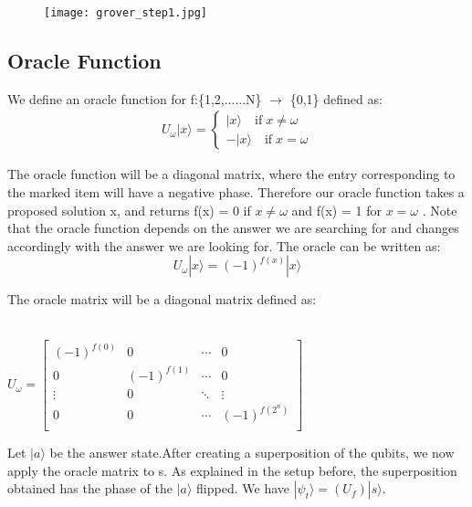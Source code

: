 \begin{figure}[!ht]
  \centering
  \texttt{[image: grover\_step1.jpg]}
\end{figure}


\subsection{Oracle Function}
We define an oracle function for f:\{1,2,......N\} $\rightarrow$ \{0,1\} defined as: \\
\begin{align*}
 U_\omega|x\rangle =
    \begin{cases}
    |x\rangle \quad \text{if} \;  x \neq \omega \\
    -|x\rangle \quad \text{if} \; x = \omega
\end{cases}
\end{align*}

The oracle function will be a diagonal matrix, where the entry corresponding to the marked item will have a negative phase. Therefore our oracle function takes a proposed solution x, and returns f(x) = 0 if $x \neq \omega $ and f(x) = 1 for $x = \omega$ . Note that the oracle function depends on the answer we are searching for and changes accordingly with the answer we are looking for. The oracle  can be written as:
\[ U_\omega|x\rangle = (-1)^{f(x)}|x\rangle \] 

The oracle matrix will be a diagonal matrix defined as: \\ \\
\begin{center}
    
$ U_\omega = 
\begin{bmatrix}
(-1)^{f(0)} &   0         & \cdots &   0         \\
0           & (-1)^{f(1)} & \cdots &   0         \\
\vdots      &   0         & \ddots & \vdots      \\
0           &   0         & \cdots & (-1)^{f(2^n)} \\
\end{bmatrix} $ \end{center} 

Let $|a\rangle$ be the answer state.After creating a superposition of the qubits, 
 we now apply the oracle matrix to s. As explained in the setup before, the superposition obtained has the phase of the $|a\rangle$ flipped.
We have $ |\psi_t \rangle = (U_f)|s\rangle $.

